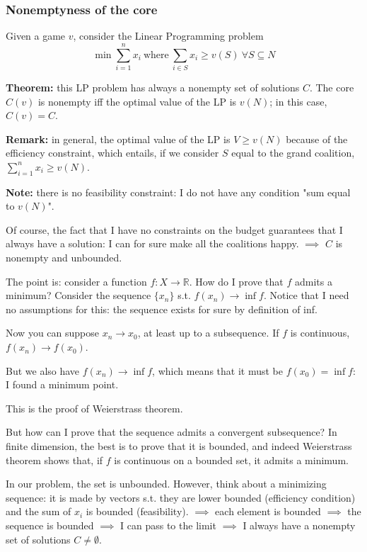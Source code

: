 \subsubsection{Nonemptyness of the core}

\noindent Given a game $v$, consider the Linear Programming problem
\[
	\min{\sum_{i=1}^{n}{x_i}} ~\text{where}~ \sum_{i \in S}{x_i} \geq v(S) ~\forall S \subseteq N
\]

\bigskip
\noindent \textbf{Theorem:} this LP problem has always a nonempty set of solutions $C$. The core $C(v)$ is nonempty iff the optimal value of the LP is $v(N)$; in this case, $C(v) = C$.

\bigskip
\noindent \textbf{Remark:} in general, the optimal value of the LP is $V \geq v(N)$ because of the efficiency constraint, which entails, if we consider $S$ equal to the grand coalition, $\sum_{i=1}^{n}{x_i} \geq v(N)$.

\bigskip
\noindent \textbf{Note:} there is no feasibility constraint: I do not have 
any condition "sum equal to $v(N)$".

\noindent Of course, the fact that I have no constraints on the budget guarantees that I always have a solution: I can for sure make all the coalitions happy. $\implies$ $C$ is nonempty and unbounded.

\bigskip
\noindent The point is: consider a function $f:X \rightarrow \mathbb{R}$. How do I prove that 
$f$ admits a minimum? Consider the sequence $\{x_n\}$ s.t. $f(x_n) \rightarrow 
\inf{f}$. Notice that I need no assumptions for this: the sequence exists for sure by definition of inf.

\noindent Now you can suppose $x_n \rightarrow x_0$, at least up to a subsequence. If $f$ is continuous, $f(x_n) \rightarrow f(x_0)$.

\noindent But we also have  $f(x_n) \rightarrow \inf{f}$, which means that it must be $f(x_0) = \inf{f}$: I found a minimum point.

\noindent This is the proof of Weierstrass theorem.

\noindent But how can I prove that the sequence admits a convergent subsequence? In finite dimension, the best is to prove that it is bounded, and indeed Weierstrass theorem shows that, if $f$ is continuous on a bounded set, it admits a minimum.

\noindent In our problem, the set is unbounded. However, think about a minimizing sequence: it is made by vectors s.t. they are lower bounded (efficiency condition) and the sum of $x_i$ is bounded (feasibility). $\implies$ each element is bounded $\implies$ the sequence is bounded $\implies$ I can pass to the limit $\implies$ I always have a nonempty set of solutions $C \neq \emptyset$.

